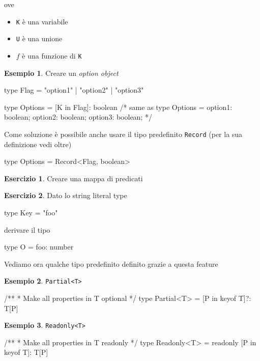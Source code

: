 \documentclass[12pt]{article}
\theoremstyle{definition}
\newtheorem{example}{Esempio}[subsection]
\newtheorem{exercise}{Esercizio}[subsection]
\newenvironment{code}
  {\vspace{0.5cm} \VerbatimEnvironment\begin{typescriptcode}}
  {\end{typescriptcode} \vspace{0.2cm}}
\begin{document}
ove

\begin{itemize}
  \item \texttt{K} è una variabile
  \item \texttt{U} è una unione
  \item $f$ è una funzione di \texttt{K}
\end{itemize}

\begin{example}
Creare un \emph{option object}

\begin{code}
type Flag = "option1" | "option2" | "option3"

type Options = { [K in Flag]: boolean }
/* same as
type Options = {
    option1: boolean;
    option2: boolean;
    option3: boolean;
}
*/
\end{code}
\end{example}

Come soluzione è possibile anche usare il tipo predefinito \texttt{Record} (per la sua definizione vedi oltre)

\begin{code}
type Options = Record<Flag, boolean>
\end{code}

\begin{exercise}
Creare una mappa di predicati
\end{exercise}

\begin{exercise}
Dato lo string literal type

\begin{code}
type Key = "foo"
\end{code}

derivare il tipo

\begin{code}
type O = {
  foo: number
}
\end{code}
\end{exercise}

Vediamo ora qualche tipo predefinito definito grazie a questa feature

\begin{example}
\texttt{Partial<T>}

\begin{code}
/**
 * Make all properties in T optional
 */
type Partial<T> = { [P in keyof T]?: T[P] }
\end{code}
\end{example}

\begin{example}
\texttt{Readonly<T>}

\begin{code}
/**
* Make all properties in T readonly
*/
type Readonly<T> = { readonly [P in keyof T]: T[P] }
\end{code}
\end{example}
\end{document}
